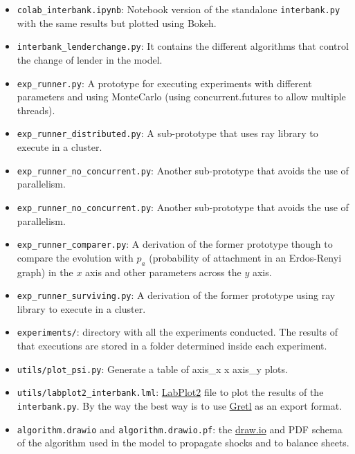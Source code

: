 \documentclass{article}
\begin{document}
\begin{itemize}
    \item \texttt{colab\_interbank.ipynb}: Notebook version of the standalone \texttt{interbank.py} with the same results but plotted using Bokeh.
    \item \texttt{interbank\_lenderchange.py}: It contains the different algorithms that control the change of lender in the model.
    \item \texttt{exp\_runner.py}: A prototype for executing experiments with different parameters and using MonteCarlo (using concurrent.futures to allow multiple threads).
    \item \texttt{exp\_runner\_distributed.py}: A sub-prototype that uses ray library to execute in a cluster.
    \item \texttt{exp\_runner\_no\_concurrent.py}: Another sub-prototype that avoids the use of parallelism.
    \item \texttt{exp\_runner\_no\_concurrent.py}: Another sub-prototype that avoids the use of parallelism.
    \item \texttt{exp\_runner\_comparer.py}: A derivation of the former prototype though to compare the evolution with $p_a$ (probability of attachment in an Erdos-Renyi graph) in the $x$ axis and other parameters across the $y$ axis.
    \item \texttt{exp\_runner\_surviving.py}: A derivation of the former prototype using ray library to execute in a cluster.
    \item \texttt{experiments/}: directory with all the experiments conducted. The results of that executions are stored in a folder determined inside each experiment.
    \item \texttt{utils/plot\_psi.py}: Generate a table of axis\_x x axis\_y plots.
    \item \texttt{utils/labplot2\_interbank.lml}: \href{https://labplot.org/}{LabPlot2} file to plot the results of the \texttt{interbank.py}. By the way the best way is to use \href{https://gretl.sourceforge.net/}{Gretl} as an export format.
    \item \texttt{algorithm.drawio} and \texttt{algorithm.drawio.pf}: the \href{https://www.drawio.com/}{draw.io} and PDF schema of the algorithm used in the model to propagate shocks and to balance sheets.
\end{itemize}
\end{document}
